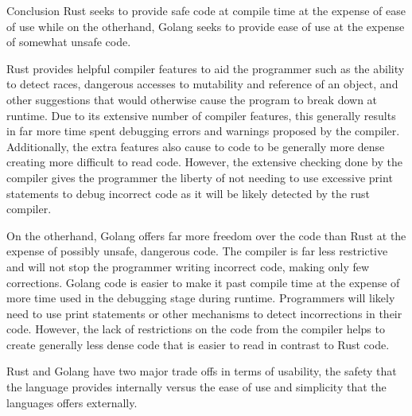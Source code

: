 Conclusion
Rust seeks to provide safe code at compile time at the expense of ease of use while on the otherhand, Golang seeks to provide ease of use at the expense of somewhat unsafe code. 

Rust provides helpful compiler features to aid the programmer such as the ability to detect races, dangerous accesses to mutability and reference of an object, and other suggestions that would otherwise cause the program to break down at runtime. Due to its extensive number of compiler features, this generally results in far more time spent debugging errors and warnings proposed by the compiler. Additionally, the extra features also cause to code to be generally more dense creating more difficult to read code. However, the extensive checking done by the compiler gives the programmer the liberty of not needing to use excessive print statements to debug incorrect code as it will be likely detected by the rust compiler. 

On the otherhand, Golang offers far more freedom over the code than Rust at the expense of possibly unsafe, dangerous code. The compiler is far less restrictive and will not stop the programmer writing incorrect code, making only few corrections. Golang code is easier to make it past compile time at the expense of more time used in the debugging stage during runtime. Programmers will likely need to use print statements or other mechanisms to detect incorrections in their code. However, the lack of restrictions on the code from the compiler helps to create generally less dense code that is easier to read in contrast to Rust code.

Rust and Golang have two major trade offs in terms of usability, the safety that the language provides internally versus the ease of use and simplicity that the languages offers externally.

